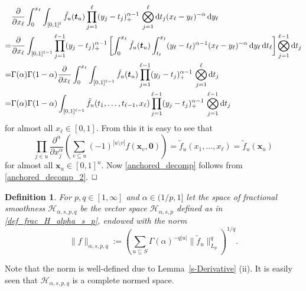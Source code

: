 \documentclass[12pt]{article}
\newtheorem{definition}{Definition}
\newenvironment{proof}{\begin{trivlist}
    \item[\hskip\labelsep{\it Proof.}]}{$\hfill\Box$\end{trivlist}}
\newcommand{\bsx}{\boldsymbol{x}}
\newcommand{\bst}{\boldsymbol{t}}
\newcommand{\bszero}{\boldsymbol{0}}
\newcommand{\HH}{\mathcal{H}}
\begin{document}
\begin{proof}
\begin{equation*}
\begin{split}
&\frac{\partial}{\partial x_\ell} \int^{x_\ell}_0
\int_{[0,1]^\ell} \tilde{f}_u(\bst_u) \prod_{j=1}^\ell
(y_j-t_j)^{\alpha-1}_+ \,\bigotimes^\ell_{j=1} {\rm d}t_j
(x_\ell -y_\ell)^{-\alpha} \,{\rm d}y_\ell\\
= &\frac{\partial}{\partial x_\ell} \int_{[0,1]^{\ell-1}}
\prod^{\ell-1}_{j=1} (y_j-t_j)^{\alpha-1}_+
\left[ \int^{x_\ell}_0 \tilde{f}_u(\bst_u) \int^{x_\ell}_{t_\ell}
(y_\ell-t_\ell)^{\alpha-1}(x_\ell-y_\ell)^{-\alpha}\,{\rm d}y_\ell
\,{\rm d}t_\ell \right] \bigotimes^{\ell-1}_{j=1} {\rm d}t_j\\
= &\Gamma(\alpha)\Gamma(1-\alpha) \frac{\partial}{\partial x_\ell}
\int^{x_\ell}_0 \int_{[0,1]^{\ell-1}} \tilde{f}_u(\bst_u)
\prod^{\ell-1}_{j=1}(y_j-t_j)^{\alpha-1}_+
\,\bigotimes^\ell_{j=1} {\rm d}t_j\\
= &\Gamma(\alpha)\Gamma(1-\alpha) \int_{[0,1]^{\ell-1}} \tilde{f}_u
(t_1,\ldots,t_{\ell-1},x_\ell) \prod^{\ell-1}_{j=1}
(y_j-t_j)^{\alpha-1}_+ \,\bigotimes^{\ell-1}_{j=1}{\rm d}t_j
\end{split}
\end{equation*}
for almost all $x_\ell \in [0,1]$.
From this it is easy to see that
\begin{equation*}
\prod_{j\in u} \frac{\partial^{\alpha}}{\partial x^\alpha_j}
\left( \sum_{v\subseteq u} (-1)^{|u\setminus v|}
f(\bsx_v,\bszero) \right) = \tilde{f}_u(x_1,\ldots,x_\ell)
=\tilde{f}_u(\bsx_u)
\end{equation*}
for almost all $\bsx_u \in [0,1]^u$. Now \eqref{anchored_decomp} follows from \eqref{anchored_decomp_2}.
\end{proof}

\begin{definition}\label{Def:Space_Frac_Smooth_Mult}
For $p,q\in [1,\infty]$ and $\alpha\in (1/p,1]$  let the \emph{space of fractional smoothness}
$\HH_{\alpha,s,p,q}$ be the vector space $\HH_{\alpha,s,p}$ defined as in \eqref{def_frac_H_alpha_s_p},
endowed with the
norm
\begin{equation*}
\|f\|_{\alpha, s,p,q} := \left( \sum_{u\subseteq S}
\Gamma(\alpha)^{-q|u|} \|\tilde{f}_u\|^{q}_{L_p}
\right)^{1/q}.
\end{equation*}
\end{definition}

Note that the norm is well-defined due to Lemma~\ref{s-Derivative} (ii). 
It is easily seen that $\HH_{\alpha,s,p,q}$
is a complete normed space. 
\end{document}
